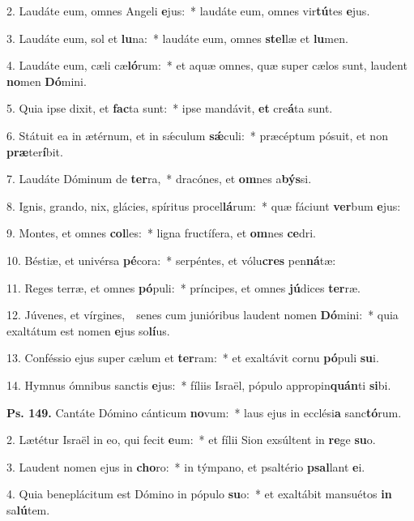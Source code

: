 
2. Laudáte eum, omnes Angeli \textbf{e}jus:~* laudáte eum, omnes vir\textbf{tú}tes \textbf{e}jus.

3. Laudáte eum, sol et \textbf{lu}na:~* laudáte eum, omnes \textbf{stel}læ et \textbf{lu}men.

4. Laudáte eum, cæli cæ\textbf{ló}rum:~* et aquæ omnes, quæ super cælos sunt, laudent \textbf{no}men \textbf{Dó}mini.

5. Quia ipse dixit, et \textbf{fac}ta sunt:~* ipse mandávit, \textbf{et} cre\textbf{á}ta sunt.

6. Státuit ea in ætérnum, et in s\'{\ae}culum \textbf{s\'{\ae}}culi:~* præcéptum pósuit, et non \textbf{præ}ter\textbf{í}bit.

7. Laudáte Dóminum de \textbf{ter}ra,~* dracónes, et \textbf{om}nes a\textbf{býs}si.

8. Ignis, grando, nix, glácies, spíritus procel\textbf{lá}rum:~* quæ fáciunt \textbf{ver}bum \textbf{e}jus:

9. Montes, et omnes \textbf{col}les:~* ligna fructífera, et \textbf{om}nes \textbf{ce}dri.

10. Béstiæ, et univérsa \textbf{pé}cora:~* serpéntes, et vólu\textbf{cres} pen\textbf{ná}tæ:

11. Reges terræ, et omnes \textbf{pó}puli:~* príncipes, et omnes \textbf{jú}dices \textbf{ter}ræ.

12. Júvenes, et vírgines,~\GreDagger\ senes cum junióribus laudent nomen \textbf{Dó}mini:~* quia exaltátum est nomen \textbf{e}jus so\textbf{lí}us.

13. Conféssio ejus super cælum et \textbf{ter}ram:~* et exaltávit cornu \textbf{pó}puli \textbf{su}i.

14. Hymnus ómnibus sanctis \textbf{e}jus:~* fíliis Israël, pópulo appropin\textbf{quán}ti \textbf{si}bi.

\textbf{Ps. 149.} Cantáte Dómino cánticum \textbf{no}vum:~* laus ejus in ecclési\textbf{a} sanc\textbf{tó}rum.

2. Lætétur Israël in eo, qui fecit \textbf{e}um:~* et fílii Sion exsúltent in \textbf{re}ge \textbf{su}o.

3. Laudent nomen ejus in \textbf{cho}ro:~* in týmpano, et psaltério \textbf{psal}lant \textbf{e}i.

4. Quia beneplácitum est Dómino in pópulo \textbf{su}o:~* et exaltábit mansuétos \textbf{in} sa\textbf{lú}tem.

